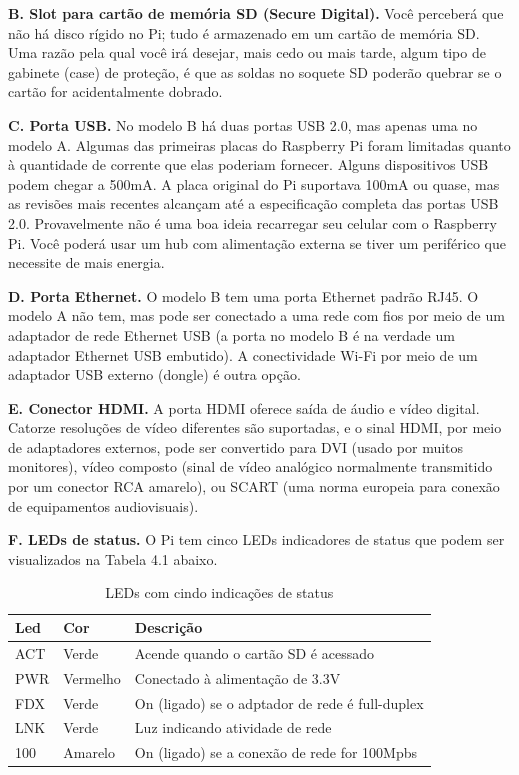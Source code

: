 \textbf{B. Slot para cartão de memória SD (Secure Digital).} Você perceberá que não há disco rígido no Pi; tudo é armazenado em um cartão de memória SD. Uma razão pela qual você irá desejar, mais cedo ou mais tarde, algum tipo de gabinete (case) de proteção, é que as soldas no soquete SD poderão quebrar se o cartão for acidentalmente dobrado.

\textbf{C. Porta USB.} No modelo B há duas portas USB 2.0, mas apenas uma no modelo A. Algumas das primeiras placas do Raspberry Pi foram limitadas quanto à quantidade de corrente que elas poderiam fornecer. Alguns dispositivos USB podem chegar a 500mA. A placa original do Pi suportava 100mA ou quase, mas as revisões mais recentes alcançam até a especificação completa das portas USB 2.0. Provavelmente não é uma boa ideia recarregar seu celular com o Raspberry Pi. Você poderá usar um hub com alimentação externa se tiver um periférico que necessite de mais energia.

\textbf{D. Porta Ethernet.} O modelo B tem uma porta Ethernet padrão RJ45. O modelo A não tem, mas pode ser conectado a uma rede com fios por meio de um adaptador de rede Ethernet USB (a porta no modelo B é na verdade um adaptador Ethernet USB embutido). A conectividade Wi-Fi por meio de um adaptador USB externo (dongle) é outra opção.

\textbf{E. Conector HDMI.} A porta HDMI oferece saída de áudio e vídeo digital. Catorze resoluções de vídeo diferentes são suportadas, e o sinal HDMI, por meio de adaptadores externos, pode ser convertido para DVI (usado por muitos monitores), vídeo composto (sinal de vídeo analógico normalmente transmitido por um conector RCA amarelo), ou SCART (uma norma europeia para conexão de equipamentos audiovisuais).

\textbf{F. LEDs de status.} O Pi tem cinco LEDs indicadores de status que podem ser visualizados na Tabela 4.1 abaixo.

\newpage

\begin{table}[!htpb]
 \centering
    \begin{tabular}{|l|p{2cm}|l|} 
    \hline
        \textbf{Led} & \textbf{Cor} & \textbf{Descrição} \\
    \hline
        ACT & Verde & Acende quando o cartão SD é acessado \\
    \hline
        PWR & Vermelho & Conectado à alimentação de 3.3V \\
    \hline
        FDX & Verde & On (ligado) se o adptador de rede é full-duplex \\
    \hline
        LNK & Verde & Luz indicando atividade de rede \\
    \hline
        100 & Amarelo & On (ligado) se a conexão de rede for 100Mpbs \\
    \hline
    \end{tabular}
    \caption{LEDs com cindo indicações de status}
    \label{t_fixa}
\end{table}

